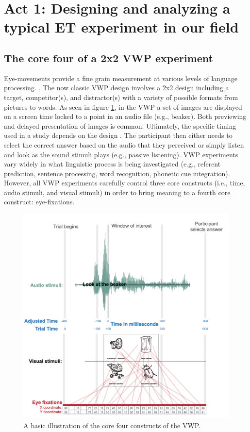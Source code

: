 \section{Act 1: Designing and analyzing a typical ET experiment in our field }
\subsection{The core four of a 2x2 VWP experiment}
Eye-movements provide a fine grain measurement at various levels of language processing.
\parencite[e.g.][]{Tanenhaus_Spivey-Knowlton_Eberhard_Sedivy_1995,Allopenna_1998}. The now classic VWP design involves a 2x2 design including a target, competitor(s), and distractor(s) with a variety of possible formats from pictures to words. As seen in figure \ref{fig:core_four}, in the VWP a set of images are displayed on a screen time locked to a point in an audio file (e.g., beaker). Both previewing and delayed presentation of images is common. Ultimately, the specific timing used in a study depends on the design  \parencite[see,][, for a review]{Apfelbaum_Klein-Packard_McMurray_2021}{}{}.  The participant then either needs to select the correct answer based on the audio that they perceived or simply listen and look as the sound stimuli plays (e.g., passive listening). VWP experiments vary widely in what linguistic process is being investigated (e.g., referent prediction, sentence processing, word recognition, phonetic cue integration). However, all VWP experiments carefully control three core constructs (i.e., time, audio stimuli, and visual stimuli) in order to bring meaning to a fourth core construct: eye-fixations. 

\begin{figure}[ht]
    \centering
    \includegraphics[scale=.6]{figures/core_four}
    \caption{A basic illustration of the core four constructs of the VWP. }
    \label{fig:core_four}
\end{figure}

